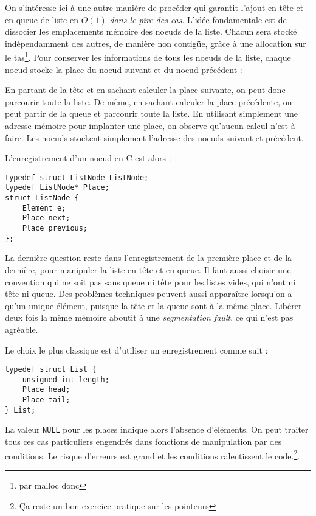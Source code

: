 \documentclass[../../../main.tex]{subfiles}
\begin{document}
On s'intéresse ici à une autre manière de procéder qui garantit l'ajout en tête et en queue de liste en $O(1)$ \textit{dans le pire des cas}. L'idée fondamentale est de dissocier les emplacements mémoire des noeuds de la liste. Chacun sera stocké indépendamment des autres, de manière non contigüe, grâce à une allocation sur le tas\footnote{par \textsf{malloc} donc}. Pour conserver les informations de tous les noeuds de la liste, chaque noeud stocke la place du noeud suivant et du noeud précédent :

\begin{minipage}{\textwidth}
	\begin{center}
		
	\end{center}
\end{minipage}

En partant de la tête et en sachant calculer la place suivante, on peut donc parcourir toute la liste. De même, en sachant calculer la place précédente, on peut partir de la queue et parcourir toute la liste. En utilisant simplement une adresse mémoire pour implanter une place, on observe qu'aucun calcul n'est à faire. Les noeuds stockent simplement l'adresse des noeuds suivant et précédent.

L'enregistrement d'un noeud en C est alors :
\begin{verbatim}
typedef struct ListNode ListNode;
typedef ListNode* Place;
struct ListNode {
	Element e;
	Place next;
	Place previous;
};
\end{verbatim}
La dernière question reste dans l'enregistrement de la première place et de la dernière, pour manipuler la liste en tête et en queue. Il faut aussi choisir une convention qui ne soit pas sans queue ni tête pour les listes vides, qui n'ont ni tête ni queue. Des problèmes techniques peuvent aussi apparaître lorsqu'on a qu'un unique élément, puisque la tête et la queue sont à la même place. Libérer deux fois la même mémoire aboutit à une \textit{segmentation fault}, ce qui n'est pas agréable.

Le choix le plus classique est d'utiliser un enregistrement comme suit :
\begin{verbatim}
typedef struct List {
	unsigned int length;
	Place head;
	Place tail;
} List;
\end{verbatim}
La valeur \texttt{NULL} pour les places indique alors l'absence d'éléments. On peut traiter tous ces cas particuliers engendrés dans fonctions de manipulation par des conditions. Le risque d'erreurs est grand et les conditions ralentissent le code.\footnote{Ça reste un bon exercice pratique sur les pointeurs}.
\end{document}
